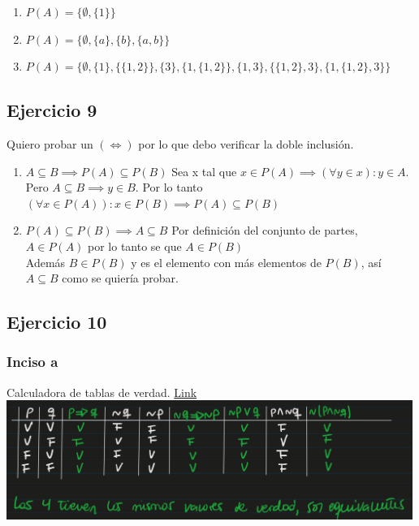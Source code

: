 \begin{enumerate}[label=(\alph*)]
    \item $P(A) = \{ \emptyset, \{ 1 \} \}$
    \item $P(A) = \{ \emptyset, \{ a \}, \{ b \}, \{ a, b \} \}$
    \item $P(A) = \{ \emptyset, \{ 1 \}, \{ \{ 1,2 \} \}, \{ 3 \}, \{ 1, \{1,2\} \}, \{ 1,3 \}, \{\{1,2\}, 3 \}, \{ 1,\{1,2\}, 3 \} \}$
\end{enumerate}

\subsection{Ejercicio 9}
Quiero probar un $(\iff)$ por lo que debo verificar la doble inclusión.

\begin{enumerate}[label=(\alph*)]
    \item $A \subseteq B \implies P(A) \subseteq P(B)$ 
            Sea x tal que $x \in P(A) \implies (\forall y \in x): y \in A$.\\
            Pero $A \subseteq B \implies y \in B$.
            Por lo tanto $(\forall x \in P(A)): x \in P(B) \implies P(A) \subseteq P(B)$
    \item $P(A) \subseteq P(B) \implies A \subseteq B$ 
            Por definición del conjunto de partes, $A \in P(A)$ por lo tanto se que $A \in P(B)$ \\
            Además $B \in P(B)$ y es el elemento con más elementos de $P(B)$, así $A \subseteq B$ como se quiería probar.
\end{enumerate}

\subsection{Ejercicio 10}

\subsubsection{Inciso a}
Calculadora de tablas de verdad. \href{https://calculadorasonline.com/generador-de-tablas-de-verdad-logica-proposicional-algebra-booleana/}{Link}\\

\includegraphics[width=500px]{1.10}

